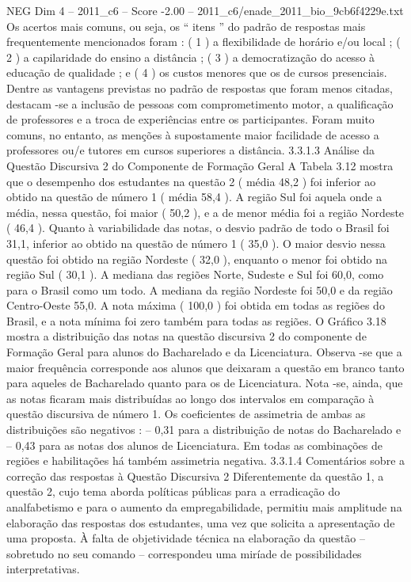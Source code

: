 \begin{textsample}{NEG Dim 4 – 2011\_c6 – Score -2.00 – 2011\_c6/enade\_2011\_bio\_9cb6f4229e.txt}
Os acertos mais comuns, ou seja, os “ itens ” do padrão de respostas mais frequentemente mencionados foram : ( 1 ) a flexibilidade de horário e/ou local ; ( 2 ) a capilaridade do ensino a distância ; ( 3 ) a democratização do acesso à educação de qualidade ; e ( 4 ) os custos menores que os de cursos presenciais.
Dentre as vantagens previstas no padrão de respostas que foram menos citadas, destacam -se a inclusão de pessoas com comprometimento motor, a qualificação de professores e a troca de experiências entre os participantes.
Foram muito comuns, no entanto, as menções à supostamente maior facilidade de acesso a professores ou/e tutores em cursos superiores a distância. 3.3.1.3 Análise da Questão Discursiva 2 do Componente de Formação Geral A Tabela 3.12 mostra que o desempenho dos estudantes na questão 2 ( média 48,2 ) foi inferior ao obtido na questão de número 1 ( média 58,4 ).
A região Sul foi aquela onde a média, nessa questão, foi maior ( 50,2 ), e a de menor média foi a região Nordeste ( 46,4 ).
Quanto à variabilidade das notas, o desvio padrão de todo o Brasil foi 31,1, inferior ao obtido na questão de número 1 ( 35,0 ).
O maior desvio nessa questão foi obtido na região Nordeste ( 32,0 ), enquanto o menor foi obtido na região Sul ( 30,1 ).
A mediana das regiões Norte, Sudeste e Sul foi 60,0, como para o Brasil como um todo.
A mediana da região Nordeste foi 50,0 e da região Centro-Oeste 55,0.
A nota máxima ( 100,0 ) foi obtida em todas as regiões do Brasil, e a nota mínima foi zero também para todas as regiões.
O Gráfico 3.18 mostra a distribuição das notas na questão discursiva 2 do componente de Formação Geral para alunos do Bacharelado e da Licenciatura.
Observa -se que a maior frequência corresponde aos alunos que deixaram a questão em branco tanto para aqueles de Bacharelado quanto para os de Licenciatura.
Nota -se, ainda, que as notas ficaram mais distribuídas ao longo dos intervalos em comparação à questão discursiva de número 1.
Os coeficientes de assimetria de ambas as distribuições são negativos : – 0,31 para a distribuição de notas do Bacharelado e – 0,43 para as notas dos alunos de Licenciatura.
Em todas as combinações de regiões e habilitações há também assimetria negativa. 3.3.1.4 Comentários sobre a correção das respostas à Questão Discursiva 2 Diferentemente da questão 1, a questão 2, cujo tema aborda políticas públicas para a erradicação do analfabetismo e para o aumento da empregabilidade, permitiu mais amplitude na elaboração das respostas dos estudantes, uma vez que solicita a apresentação de uma proposta.
À falta de objetividade técnica na elaboração da questão – sobretudo no seu comando – correspondeu uma miríade de possibilidades interpretativas.

\end{textsample}
